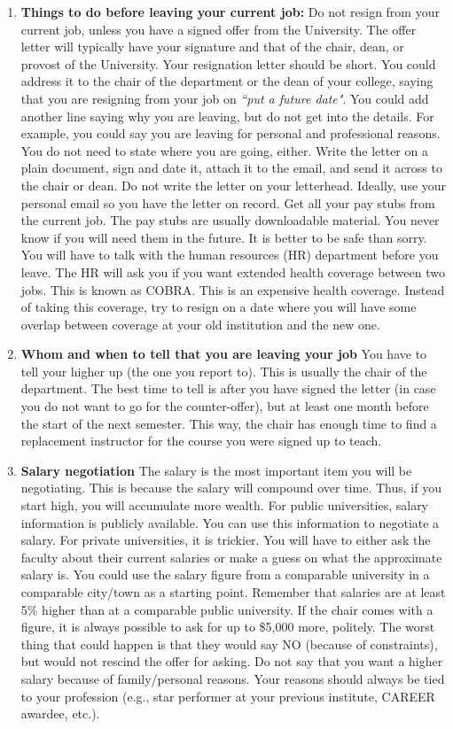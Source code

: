\documentclass[14pt]{article}
\begin{document}
\begin{enumerate}
\item {\bf Things to do before leaving your current job:} Do not resign from your current job, unless you have a signed offer from the University. The offer letter will typically have your signature and that of the chair, dean, or provost of the University. Your resignation letter should be short. You could address it to the chair of the department or the dean of your college, saying that you are resigning from your job on {\it ``put a future date"}. You could add another line saying why you are leaving, but do not get into the details. For example, you could say you are leaving for personal and professional reasons. You do not need to state where you are going, either. Write the letter on a plain document, sign and date it, attach it to the email, and send it across to the chair or dean. 
Do not write the letter on your letterhead. Ideally, use your personal email so you have the letter on record. Get all your pay stubs from the current job. The pay stubs are usually downloadable material. You never know if you will need them in the future. It is better to be safe than sorry. You will have to talk with the human resources (HR) department before you leave. The HR will ask you if you want extended health coverage between two jobs. This is known as COBRA. This is an expensive health coverage. Instead of taking this coverage, try to resign on a date where you will have some overlap between coverage at your old institution and the new one. 
\item {\bf Whom and when to tell that you are leaving your job} You have to tell your higher up (the one you report to). This is usually the chair of the department. The best time to tell is after you have signed the letter (in case you do not want to go for the counter-offer), but at least one month before the start of the next semester. This way, the chair has enough time to find a replacement instructor for the course you were signed up to teach. 
\item {\bf Salary negotiation} The salary is the most important item you will be negotiating. This is because the salary will compound over time. Thus, if you start high, you will accumulate more wealth. For public universities, salary information is publicly available. You can use this information to negotiate a salary. For private universities, it is trickier. You will have to either ask the faculty about their current salaries or make a guess on what the approximate salary is. You could use the salary figure from a comparable university in a comparable city/town as a starting point. Remember that salaries are at least 5\% higher than at a comparable public university. If the chair comes with a figure, it is always possible to ask for up to \$5,000 more, politely. The worst thing that could happen is that they would say NO (because of constraints), but would not rescind the offer for asking. Do not say that you want a higher salary because of family/personal reasons. Your reasons should always be tied to your profession (e.g., star performer at your previous institute, CAREER awardee, etc.). 

\end{enumerate}
\end{document}
